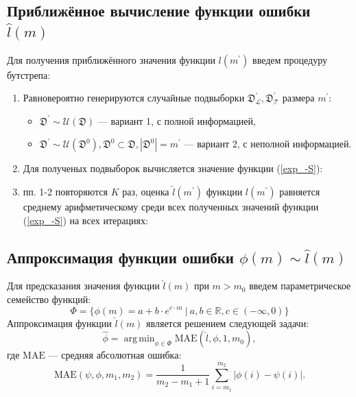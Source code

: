 \documentclass[12pt, a4paper]{scrartcl}
\DeclareMathOperator*{\argmin}{arg\,min}
\theoremstyle{plain}
\theoremstyle{definition}
\begin{document}
\subsection{Приближённое вычисление функции ошибки $\hat{l}(m)$}

Для получения приближённого значения функции $l(m^{\prime})$ введем процедуру бутстрепа:

\begin{enumerate}
	\item Равновероятно генерируются случайные подвыборки $\mathfrak D^{\prime}_{\mathcal{L}}, \mathfrak D^{\prime}_{\mathcal{T}}$ размера $m^{\prime}$:

	\begin{itemize}
		\item $\mathfrak D^{\prime} \sim \mathcal{U}(\mathfrak{D})$ --- вариант 1, с полной информацией,
		\item $\mathfrak D^{\prime} \sim \mathcal{U}(\mathfrak{D}^0), \mathfrak{D}^0 \subset \mathfrak{D}, |\mathfrak{D}^0| = m^{\prime}$ --- вариант 2, с неполной информацией.
	\end{itemize}
	\item Для полученых подвыборок вычисляется значение функции (\ref{exp_-S}):
	\item пп. 1-2 повторяются $K$ раз, оценка $\hat{l}(m^{\prime})$ функции $l(m^{\prime})$ равняется среднему арифметическому среди всех полученных значений функции (\ref{exp_-S}) на всех итерациях:
\end{enumerate}

\subsection{Аппроксимация функции ошибки $\phi(m) \sim \hat{l}(m)$}

Для предсказания значения функции $\hat{l}(m)$ при $m > m_0$ введем параметрическое семейство функций:
\begin{equation}\label{Phi}
\Phi = \{\phi(m) =  a + b\cdot e^{c \cdot m} ~|~ a, b \in \mathbb{R}, c \in (-\infty, 0)\}
\end{equation}
Аппроксимация функции  $\hat{l}(m)$ является решением следующей задачи:
\begin{equation}\label{argmin_MAPE}
\hat{\phi} =  \argmin_{\phi \in \Phi}\text{MAE}(\hat{l}, \phi, 1, m_0),
\end{equation}
где $\text{MAE}$ --- средняя абсолютная ошибка:
\begin{equation}\label{MAPE}
\text{MAE}(\psi, \phi, m_1, m_2) = \frac{1}{m_2 - m_1 + 1}\sum_{i=m_1}^{m_2}|\phi(i) - \psi(i)|.
\end{equation}
\end{document}
